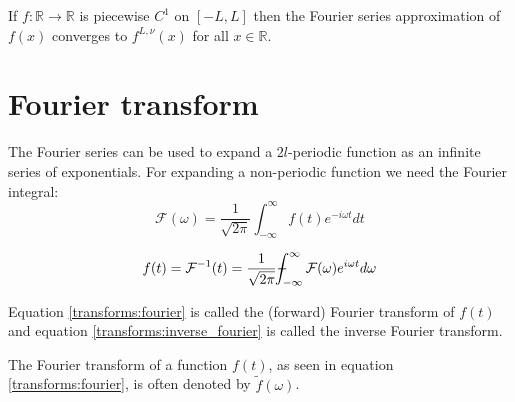     \begin{theorem}
    	If $f:\mathbb{R}\rightarrow\mathbb{R}$ is piecewise $C^1$ on $[-L, L]$ then the Fourier series approximation of $f(x)$ converges to $f^{L, \nu}(x)$ for all $x\in\mathbb{R}$.
    \end{theorem}

\section{Fourier transform}
	The Fourier series can be used to expand a $2l$-periodic function as an infinite series of exponentials. For expanding a non-periodic function we need the Fourier integral: 
	\begin{equation}
		\label{transforms:fourier}
        \boxed{\mathcal{F}(\omega) = \frac{1}{\sqrt{2\pi}} \int_{-\infty}^{\infty}f(t)e^{-i\omega t}dt}
	\end{equation}
    
    \begin{equation}
		\label{transforms:inverse_fourier}
        f(t) = \mathcal{F}^{-1}(t) = \frac{1}{\sqrt{2\pi}} \Xint-_{-\infty}^{\infty}\mathcal{F}(\omega)e^{i\omega t}d\omega
	\end{equation}
    
    Equation \ref{transforms:fourier} is called the (forward) Fourier transform of $f(t)$ and equation \ref{transforms:inverse_fourier} is called the inverse Fourier transform.
    
    \begin{notation}
		The Fourier transform of a function $f(t)$, as seen in equation \ref{transforms:fourier}, is often denoted by $\widetilde{f}(\omega)$.
	\end{notation}
    
